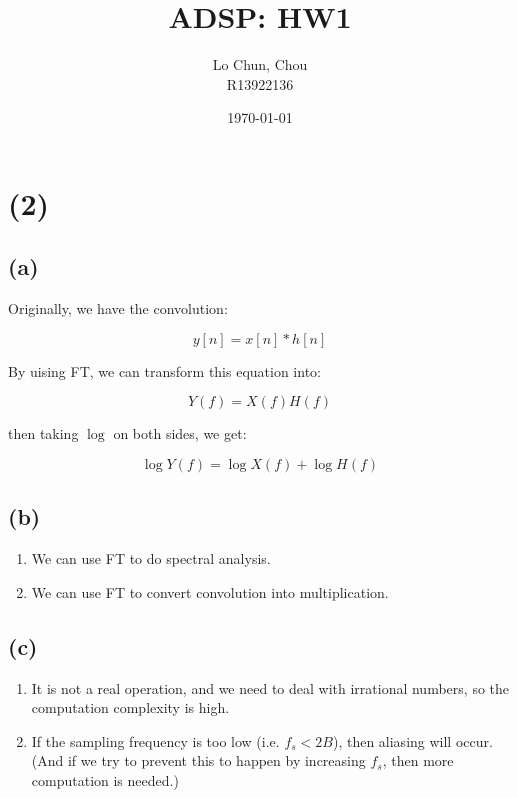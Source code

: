 \documentclass{article}
\title{ADSP: HW1}
\author{Lo Chun, Chou \\ R13922136}
\date\today
\begin{document}
\setlength{\parindent}{0pt}
\maketitle 

\section*{(2)}

\subsection*{(a)}   

Originally, we have the convolution:

\begin{equation*}
    y[n] = x[n] * h[n]
\end{equation*}

By uising FT, we can transform this equation into:

\begin{equation*}
    Y(f) = X(f)H(f)
\end{equation*}

then taking $\log$ on both sides, we get:

\begin{equation*}
    \log Y(f) = \log X(f) + \log H(f)
\end{equation*}

\subsection*{(b)}

\begin{enumerate}
    \item We can use FT to do spectral analysis.
    \item We can use FT to convert convolution into multiplication.
\end{enumerate}

\subsection*{(c)}

\begin{enumerate}
    \item It is not a real operation, and we need to deal with irrational numbers, so the computation complexity is high.
    \item If the sampling frequency is too low (i.e. $f_s < 2B$), then aliasing will occur. (And if we try to prevent this to happen by increasing $f_s$, then more computation is needed.)
\end{enumerate}
\end{document}
